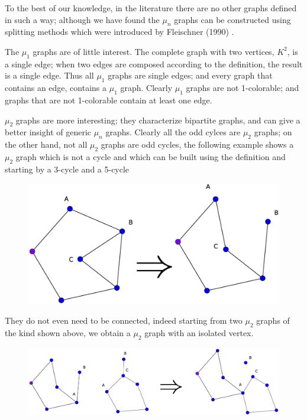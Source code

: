 \documentclass[a4paper,12pt,oneside]{book}
\begin{document}
To the best of our knowledge, in the literature there are no other graphs defined in such a way; although we have found the $\mu_n$ graphs can be constructed using splitting methods which were introduced by Fleischner (1990) \cite{split}.

The $\mu_1$ graphs are of little interest. The complete graph with two vertices, $K^2$, is a single edge; when two edges are composed according to the definition, the result is a single edge. Thus all $	\mu_1$ graphs are single edges; and every graph that contains  an edge, contains a $\mu_1$ graph. Clearly $\mu_1$ graphs are not 1-colorable; and graphs that are not 1-colorable contain at least one edge.

$\mu_2$ graphs are more interesting; they characterize bipartite graphs, and can give a better insight of generic $\mu_n$ graphs. Clearly all the odd cylces are $\mu_2$ graphs; on the other hand, not all $\mu_2$ graphs are odd cycles, the following example shows a $\mu_2$ graph which is not a cycle and which can be built using the definition and starting by a 3-cycle and a 5-cycle 
\begin{figure}[h]
\centering\includegraphics[scale=0.25]{mu2.eps}
\end{figure}

\noindent They do not even need to be connected, indeed starting from two $\mu_2$ graphs of the kind shown above, we obtain a $\mu_2$ graph with an isolated vertex.

\begin{figure}[h]
\centering\includegraphics[scale=0.25]{mu2-con1.eps}
\end{figure}
\end{document}

